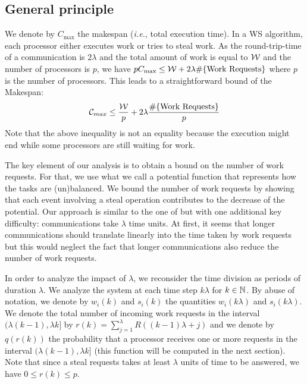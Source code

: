 \subsection{General principle}
\label{generalPrinciple}
We denote by $C_{\max}$ the makespan (\emph{i.e.}, total execution
time).  In a WS algorithm, each processor either executes work or tries
to steal work. As the round-trip-time of a communication is $2\lambda$
and the total amount of work is equal to $\mathcal{W}$ and the number of
processors is $p$, we have
$pC_{\max} \le \mathcal{W} + 2\lambda\#\text{\{Work Requests\}}$ where $p$ is
the number of processors.  This leads to a straightforward bound of
the Makespan:
\begin{equation}
\centering
  \label{Cmax}
  \mathcal{C}_{max}  \leq \frac{\calW}{p} + 2\lambda\frac{\nbworkrequest}{p}
\end{equation}
Note that the above inequality is not an equality because the
execution might end while some processors are still waiting for work.

The key element of our analysis is to obtain a bound on the number of
work requests. For that, we use what we call a potential function that
represents how the tasks are (un)balanced.  We bound the number of
work requests by showing that each event involving a steal operation
contributes to the decrease of the potential.  Our approach is similar
to the one of \cite{Denis2013} but with one additional key difficulty:
communications take $\lambda$ time units. At first, it seems that
longer communications should translate linearly into the time taken by
work requests but this would neglect the fact that longer
communications also reduce the number of work requests.

In order to analyze the impact of $\lambda$, we reconsider the time
division as periods of duration $\lambda$.  We analyze the system at
each time step $k\lambda$ for $k\in\mathbb{N}$.  By abuse of notation, we
denote by $w_i(k)$ and $s_i(k)$ the quantities $w_i(k\lambda)$ and
$s_i(k\lambda)$. %
We denote the total number of incoming work requests in the
interval $(\lambda(k-1), \lambda k] $ by
$r(k) = \sum_{j=1}^{\lambda}R((k-1)\lambda+j)$ and we denote by
$q(r(k))$ the probability that a processor receives one or more
requests in the interval $(\lambda(k-1), \lambda k]$ (this function
will be computed in the next section). Note that since a steal
requests takes at least $\lambda$ units of time to be answered, we
have $0\le r(k)\le p$.

